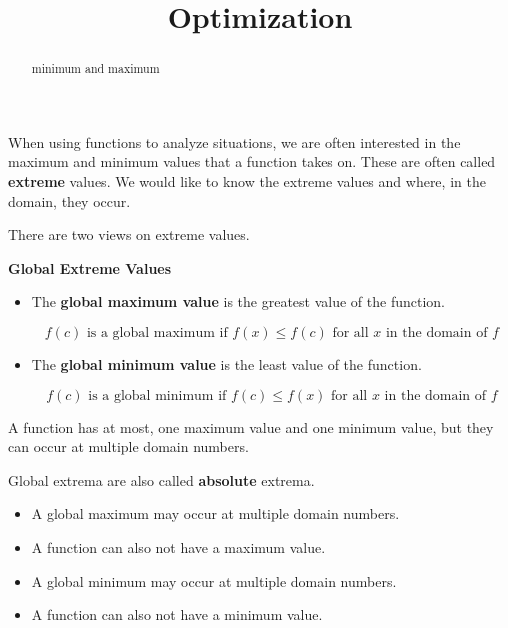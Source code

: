 \documentclass{ximera}
\title{Optimization}
\begin{document}
\begin{abstract}
minimum and maximum
\end{abstract}
\maketitle



When using functions to analyze situations, we are often interested in the maximum and minimum values that a function takes on. These are often called \textbf{extreme} values. We would like to know the extreme values and where, in the domain, they occur.



There are two views on extreme values.

\begin{definition} \textbf{\textcolor{green!50!black}{Global Extreme Values}} 

\begin{itemize}
\item The \textbf{global maximum value} is the greatest value of the function.  

\[  f(c) \text{ is a global maximum if } f(x) \leq f(c) \text{ for all } x \text{ in the domain of } f \]

\item The \textbf{global minimum value} is the least value of the function.  

\[  f(c) \text{ is a global minimum if } f(c) \leq f(x) \text{ for all } x \text{ in the domain of } f \]
\end{itemize}

A function has at most, one maximum value and one minimum value, but they can occur at multiple domain numbers.

Global extrema are also called \textbf{absolute} extrema.

\end{definition}




\begin{warning}

\begin{itemize}
\item A global maximum may occur at multiple domain numbers.  
\item A function can also not have a maximum value.
\end{itemize}

\begin{itemize}
\item A global minimum may occur at multiple domain numbers.  
\item A function can also not have a minimum value.
\end{itemize}

\end{warning}
\end{document}
